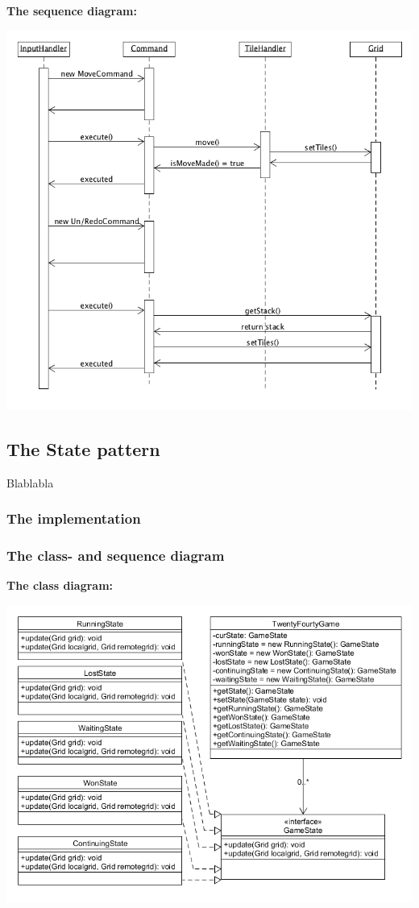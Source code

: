 \documentclass[a4paper,11pt,report]{scrartcl}
\begin{document}
\newpage\textbf{The sequence diagram:}\\
\centerline{\includegraphics[scale=0.5]{sources/commandPatternSequence}}

\newpage\subsection{The State pattern}
Blablabla

\subsubsection{The implementation}

\newpage\subsubsection{The class- and sequence diagram}
\textbf{The class diagram:}\\
\centerline{\includegraphics[scale=0.7]{sources/statePatternUML}}
\end{document}
